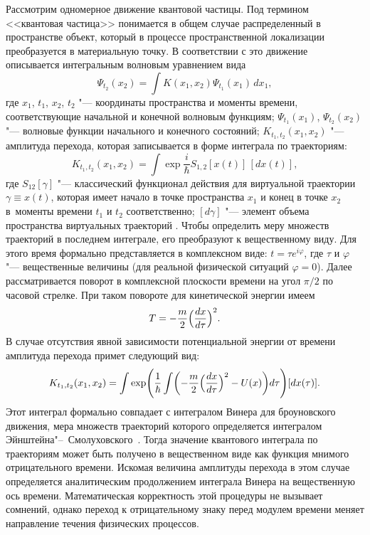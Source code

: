 \smallskip

Рассмотрим одномерное движение квантовой частицы. Под термином <<квантовая частица>> понимается в общем случае распределенный в пространстве объект, который в процессе пространственной локализации преобразуется в материальную точку. В соответствии с \cite{bib:F,bib:KV} это движение описывается интегральным волновым уравнением вида
 \begin{equation}\label{eq:math:ex1}
    \Psi_{t_{2}}(x_{2})=\int K(x_{1},x_{2})\Psi_{t_{1}}(x_{1})\,dx_{1},
\end{equation}
где $ x_{1} $, $t_{1} $, $ x_{2} $, $t_{2} $ "--- координаты пространства и моменты времени, соответствующие начальной и конечной волновым функциям; $ \Psi_{t_{1}}(x_{1})$, $ \Psi_{t_{2}}(x_{2})$ "--- волновые функции начального и конечного состояний; $ K_{t_{1},t_{2}}(x_{1},x_{2})$ "--- амплитуда перехода, которая записывается в форме интеграла по траекториям:
\begin{equation}\label{eq:math:ex2}
    K_{t_{1},t_{2}}(x_{1},x_{2})=\int \exp{\frac{i}{\hbar}S_{1,2}[x(t)]}\,[dx(t)],
\end{equation}
где $ S_{12}[\gamma]$ "--- классический функционал действия для виртуальной траектории $ \gamma\equiv x(t)$, которая имеет начало в точке пространства $ x_{1}$ и конец в точке $ x_{2}$ в~моменты времени $ t_{1}$ и $ t_{2}$ соответственно; $[d\gamma]$ "--- элемент объема пространства виртуальных траекторий \cite{bib:EDK}. Чтобы определить меру множеств траекторий в последнем интеграле, его преобразуют к вещественному виду. Для этого время формально представляется в комплексном виде: $ t=\tau e^{i\varphi} $, где $\tau $ и $\varphi $ "--- вещественные величины (для реальной физической ситуаций $\varphi=0 $). Далее рассматривается поворот в комплексной плоскости времени на угол ${\pi}/{2} $ по часовой стрелке. При таком повороте для кинетической энергии имеем
\begin{equation}\label{eq:math:ex4}
  T=-\frac{m}{2}\Bigl(\frac{dx}{d\tau}\Bigr)^{2}.
\end{equation}
В случае отсутствия явной зависимости потенциальной энергии от времени амплитуда перехода примет следующий вид:
\begin{equation}\label{eq:math:ex5}
    K_{t_{1},t_{2}}(x_{1},x_{2})=\int \exp\Biggl({\frac{1}{\hbar}\int\biggl(-\frac{m}{2}\Bigl(\frac{dx}{d\tau}\Bigr)^{2}}-U(x)\biggr)d\tau\Biggr)[dx(\tau)].
\end{equation}
Этот интеграл формально совпадает с интегралом Винера для броуновского движения, мера множеств траекторий которого определяется интегралом Эйнштейна"--~Смолуховского~\cite{bib:KPT}. Тогда значение квантового интеграла по траекториям может быть получено в вещественном виде как функция мнимого отрицательного времени. Искомая величина амплитуды перехода в этом случае определяется аналитическим продолжением интеграла Винера на вещественную ось времени. Математическая корректность этой процедуры не вызывает сомнений, однако переход к отрицательному знаку перед модулем времени меняет направление течения физических процессов. 
